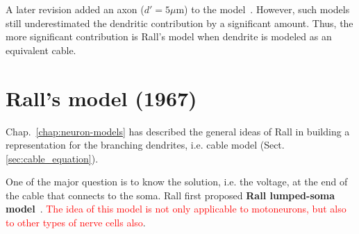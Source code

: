 A later revision added an axon ($d'=5\mu$m) to the
model~\citep{coombs1959ecm}. However, such models still underestimated
the dendritic contribution by a significant amount. Thus, the more
significant contribution is Rall's model when dendrite is modeled as
an equivalent cable.

\section{Rall's model (1967)}
\label{sec:ralls-model}


Chap.~\ref{chap:neuron-models} has described the general ideas of Rall
in building a representation for the branching dendrites, i.e.  cable
model (Sect.\ref{sec:cable_equation}). 

One of the major question is to know the solution, i.e.
the voltage, at the end of the cable that connects to the soma.  Rall first
proposed {\bf Rall lumped-soma model}~\citep{rall1967dts}.
\textcolor{red}{The idea of this model is not only applicable to
  motoneurons, but also to other types of nerve cells also}.

